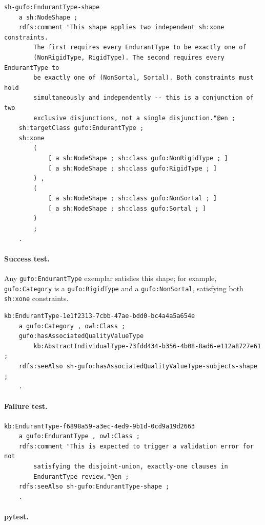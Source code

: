 \documentclass[12pt,a4paper]{article}
\newcommand{\gufoclass}[1]{\nolinkurl{gufo:#1}}
\newcommand{\shprop}[1]{\nolinkurl{sh:#1}}
\begin{document}
\begin{lstlisting}[style=turtlestyle]
sh-gufo:EndurantType-shape
    a sh:NodeShape ;
    rdfs:comment "This shape applies two independent sh:xone constraints.
        The first requires every EndurantType to be exactly one of
        (NonRigidType, RigidType). The second requires every EndurantType to
        be exactly one of (NonSortal, Sortal). Both constraints must hold
        simultaneously and independently -- this is a conjunction of two
        exclusive disjunctions, not a single disjunction."@en ;
    sh:targetClass gufo:EndurantType ;
    sh:xone
        (
            [ a sh:NodeShape ; sh:class gufo:NonRigidType ; ]
            [ a sh:NodeShape ; sh:class gufo:RigidType ; ]
        ) ,
        (
            [ a sh:NodeShape ; sh:class gufo:NonSortal ; ]
            [ a sh:NodeShape ; sh:class gufo:Sortal ; ]
        )
        ;
    .
\end{lstlisting}

\paragraph{Success test.}
Any \gufoclass{EndurantType} exemplar satisfies this shape; for example,
\gufoclass{Category} is a \gufoclass{RigidType} and a \gufoclass{NonSortal},
satisfying both \shprop{xone} constraints.

\begin{lstlisting}[style=turtlestyle]
kb:EndurantType-1e1f2313-7cbb-47ae-bdd0-bc4a4a5a654e
    a gufo:Category , owl:Class ;
    gufo:hasAssociatedQualityValueType
        kb:AbstractIndividualType-73fdd434-b356-4b08-8ad6-e112a8727e61 ;
    rdfs:seeAlso sh-gufo:hasAssociatedQualityValueType-subjects-shape ;
    .
\end{lstlisting}

\paragraph{Failure test.}

\begin{lstlisting}[style=turtlestyle]
kb:EndurantType-f6898a59-a3ec-4ed9-9b1d-0cd9a19d2663
    a gufo:EndurantType , owl:Class ;
    rdfs:comment "This is expected to trigger a validation error for not
        satisfying the disjoint-union, exactly-one clauses in
        EndurantType review."@en ;
    rdfs:seeAlso sh-gufo:EndurantType-shape ;
    .
\end{lstlisting}

\paragraph{pytest.}
\end{document}
